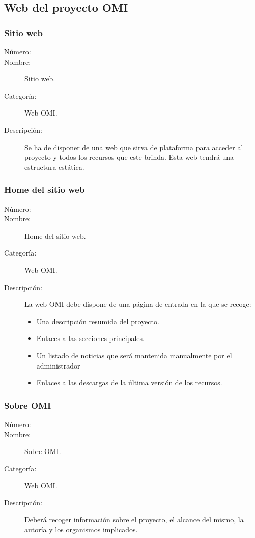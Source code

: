 \subsection{Web del proyecto OMI}

\subsubsection{Sitio web}
	\begin{description}
		\item [Número:] \cn
		\item [Nombre:] Sitio web.
		\item [Categoría:] Web OMI.
		\item [Descripción:] Se ha de disponer de una web que sirva de plataforma para acceder al 
      proyecto y todos los recursos que este brinda. Esta web tendrá una estructura estática.
	\end {description}

\subsubsection{Home del sitio web}
	\begin{description}
		\item [Número:] \cn
		\item [Nombre:] Home del sitio web.
		\item [Categoría:] Web OMI.
		\item [Descripción:] La web OMI debe dispone de una página de entrada en la que se
      recoge: 
      \begin{itemize}
      \item Una descripción resumida del proyecto.
      \item Enlaces a las secciones principales.
      \item Un listado de noticias que será mantenida manualmente por el administrador
      \item Enlaces a las descargas de la última versión de los recursos.
      \end{itemize}
	\end {description}

\subsubsection{Sobre OMI}
	\begin{description}
		\item [Número:] \cn
		\item [Nombre:] Sobre OMI.
		\item [Categoría:] Web OMI.
		\item [Descripción:] Deberá recoger información sobre el proyecto, el alcance del mismo, la autoría y los organismos implicados.
	\end {description}

